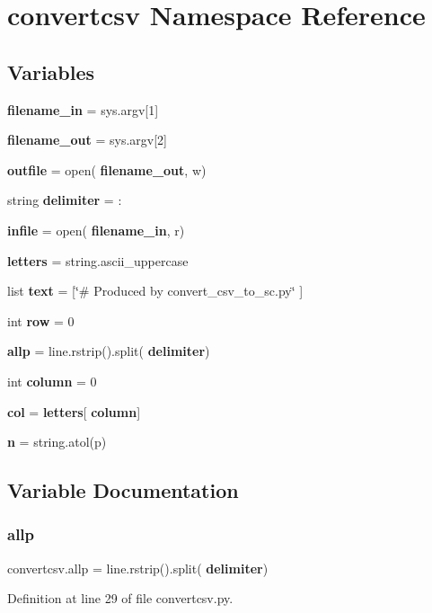 \section{convertcsv Namespace Reference}
\label{namespaceconvertcsv}
\subsection*{Variables}
\begin{DoxyCompactItemize}
\item 
\textbf{ filename\+\_\+in} = sys.\+argv[1]
\item 
\textbf{ filename\+\_\+out} = sys.\+argv[2]
\item 
\textbf{ outfile} = open(\textbf{ filename\+\_\+out}, \textquotesingle{}w\textquotesingle{})
\item 
string \textbf{ delimiter} = \textquotesingle{}\+:\textquotesingle{}
\item 
\textbf{ infile} = open(\textbf{ filename\+\_\+in}, \textquotesingle{}r\textquotesingle{})
\item 
\textbf{ letters} = string.\+ascii\+\_\+uppercase
\item 
list \textbf{ text} = [\char`\"{}\# Produced by convert\+\_\+csv\+\_\+to\+\_\+sc.\+py\char`\"{} ]
\item 
int \textbf{ row} = 0
\item 
\textbf{ allp} = line.\+rstrip().split(\textbf{ delimiter})
\item 
int \textbf{ column} = 0
\item 
\textbf{ col} = \textbf{ letters}[\textbf{ column}]
\item 
\textbf{ n} = string.\+atol(p)
\end{DoxyCompactItemize}


\subsection{Variable Documentation}
\mbox{\label{namespaceconvertcsv_ae302e7fcec1ed81ed0da74fd61e5e870}} 
\subsubsection{allp}
{\footnotesize\ttfamily convertcsv.\+allp = line.\+rstrip().split(\textbf{ delimiter})}



Definition at line 29 of file convertcsv.\+py.

